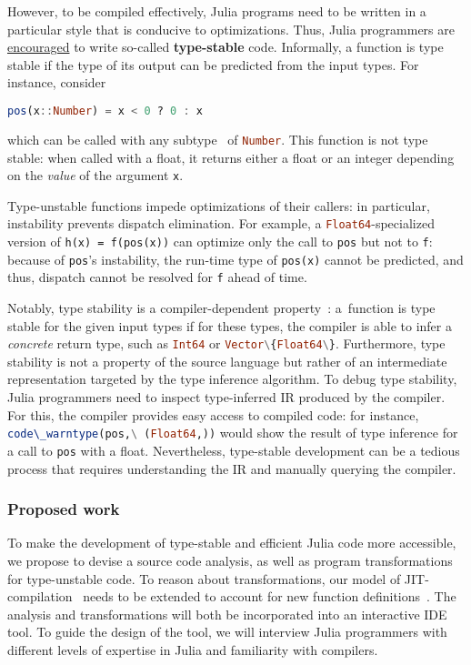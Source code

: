 \documentclass[twocolumn]{article}
\newcommand{\jlc}[1]{\lstinline[language=Julia]|#1|\xspace}
\begin{document}
However, to be compiled effectively,
Julia programs need to be written in a particular style
that is conducive to optimizations. Thus, %
Julia programmers are
\href{https://docs.julialang.org/en/v1/manual/performance-tips/#Write-%22type-stable%22-functions}{encouraged}
to write so-called \textbf{type-stable} code. Informally, a
function is type stable if the type of its output can be predicted from
the input types. For instance, consider
\begin{lstlisting}[language=Julia]
  pos(x::Number) = x < 0 ? 0 : x
\end{lstlisting}
which can be called with any subtype~\cite{subtyping} of \jlc{Number}.
This function is not type stable: when called with a float,
it returns either a float or an
integer depending on the \emph{value} of the argument \texttt{x}.

Type-unstable functions impede optimizations of their callers: in
particular, instability prevents dispatch elimination. For example, a
\jlc{Float64}-specialized version of \texttt{h(x)\ =\ f(pos(x))} can
optimize only the call to \texttt{pos} but not to \texttt{f}: because of
\texttt{pos}'s instability, the run-time type of \texttt{pos(x)} cannot
be predicted, and thus, dispatch cannot be resolved for \texttt{f} ahead
of time.

Notably, type stability is a compiler-dependent property~\cite{stability}:
a~function is type stable for the given input types
if for these types, the compiler is able to infer a \emph{concrete}
return type, such as \jlc{Int64} or \jlc{Vector\{Float64\}}.
Furthermore, type stability is not a property of the source language but
rather of an intermediate representation targeted by the type inference
algorithm. To debug type stability, Julia programmers need to inspect
type-inferred IR produced by the compiler. For this, the compiler
provides easy access to compiled code: for instance,
\jlc{code\_warntype(pos,\ (Float64,))} would show the result of type
inference for a call to \texttt{pos} with a float. Nevertheless,
type-stable development can be a tedious process that requires
understanding the IR and manually querying the compiler.

\subsubsection*{Proposed work}\label{proposed-work}

To make the development of type-stable and efficient Julia code more
accessible, we propose to devise a source code analysis, as well as
program transformations for type-unstable code.
To reason about transformations, our model of JIT-compilation~\cite{stability}
needs to be extended to account for new function definitions~\cite{worldage}.
The analysis and
transformations will both be incorporated into an interactive IDE tool.
To guide the design of the tool, we will interview Julia programmers
with different levels of expertise in Julia and familiarity with
compilers.
\end{document}
